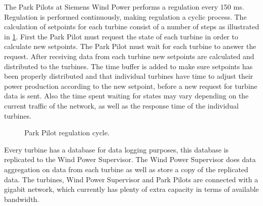 The Park Pilots at Siemens Wind Power performs a regulation every 150 ms.
Regulation is performed continuously, making regulation a cyclic process. The calculation of setpoints for each turbine consist of a number of steps as illustrated in \cref{fig:currentSiemensCycleTime}. First the Park Pilot must request the state of each turbine in order to calculate new setpoints. The Park Pilot must wait for each turbine to answer the request. After receiving data from each turbine new setpoints are calculated and distributed to the turbines. The time buffer is added to make sure setpoints has been properly distributed and that individual turbines have time to adjust their power production according to the new setpoint, before a new request for turbine data is sent. Also the time spent waiting for states may vary depending on the current traffic of the network, as well as the response time of the individual turbines.

\begin{figure}[!h]
	\centering
	
	\caption[The current Siemens wind farm system overview]{
		\label{fig:currentSiemensCycleTime} 
		\footnotesize{%
			Park Pilot regulation cycle.
		}
	}
\end{figure}

Every turbine has a database for data logging purposes, this database is replicated to the Wind Power Supervisor.
The Wind Power Supervisor does data aggregation on data from each turbine as well as store a copy of the replicated data.
The turbines, Wind Power Supervisor and Park Pilots are connected with a gigabit network, which currently has plenty of extra capacity in terms of available bandwidth.

%	
%		
%	
%					
%

